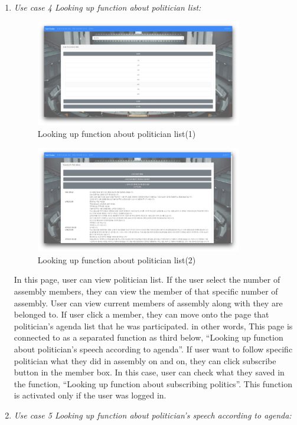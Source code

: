 \documentclass[conference]{IEEEtran}
\begin{document}
\begin{enumerate}
\item \textit{Use case 4 Looking up function about politician list: } 
\begin{figure}[htbp]
\centerline{\includegraphics[width=90mm,scale=0.5]{fig/usecase7.png}}
\caption{Looking up function about politician list(1)}
\label{fig}
\end{figure}


\begin{figure}[htbp]
\centerline{\includegraphics[width=90mm,scale=0.5]{fig/usecase8.png}}
\caption{Looking up function about politician list(2)}
\label{fig}
\end{figure}
In this page, user can view politician list. If the user select the number of assembly members, they can view the member of that specific number of assembly. User can view current members of assembly along with they are belonged to. If user click a member, they can move onto the page that politician’s agenda list that he was participated. in other words, This page is connected to as a separated function as third below, “Looking up  function about politician’s speech according to agenda”.
If user want to follow specific politician what they did in assembly  on and on, they can click subscribe button in the member box. In this case, user can check what they saved in the function, “Looking up function about subscribing politics”. This function is activated only if the user was logged in.\\



\item \textit{Use case 5  Looking up function about politician’s speech according to agenda:}


\end{enumerate}
\end{document}
